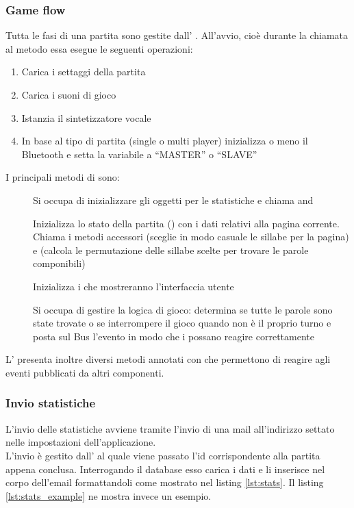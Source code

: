 \subsubsection{Game flow}
\label{sec:game_flow}
Tutta le fasi di una partita sono gestite dall' .
All'avvio, cioè durante la chiamata al metodo  essa esegue le seguenti operazioni:
\begin{enumerate}
\item Carica i settaggi della partita
\item Carica i suoni di gioco
\item Istanzia il sintetizzatore vocale 
\item In base al tipo di partita (single o multi player) inizializza o meno il Bluetooth e setta la variabile  a ``MASTER'' o ``SLAVE''
\end{enumerate}

I principali metodi di  sono:
\begin{description}
\item[] Si occupa di inizializzare gli oggetti per le statistiche e chiama  and 
\item[] Inizializza lo stato della partita () con i dati relativi alla pagina corrente. Chiama i metodi accessori  (sceglie in modo casuale le sillabe per la pagina) e  (calcola le permutazione delle sillabe scelte per trovare le parole componibili)
\item[] Inizializza i  che mostreranno l'interfaccia utente
\item[] Si occupa di gestire la logica di gioco: determina se tutte le parole sono state trovate o se interrompere il gioco quando non è il proprio turno e posta sul Bus l'evento  in modo che i  possano reagire correttamente
\end{description}

L' presenta inoltre diversi metodi annotati con  che permettono di reagire agli eventi pubblicati da altri componenti.

\subsubsection{Invio statistiche}
\label{sec:stats_send}
L'invio delle statistiche avviene tramite l'invio di una mail all'indirizzo settato nelle impostazioni dell'applicazione.\\
L'invio è gestito dall'  al quale viene passato l'id corrispondente alla partita appena conclusa. Interrogando il database esso carica i dati e li inserisce nel corpo dell'email formattandoli come mostrato nel listing \ref{lst:stats}. Il listing \ref{lst:stats_example} ne mostra invece un esempio.

